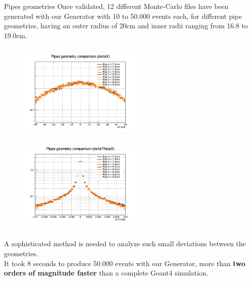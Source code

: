 \documentclass[handout,8 pt]{beamer}
\begin{document}
\begin{frame}{Pipes geometries}
\justifying
Once validated, 12 different Monte-Carlo files have been generated with our Generator with 10 to 50.000 events each, for different pipe geometries, having an outer radius of 20cm and inner radii ranging from 16.8 to 19.0cm. \vfill

\begin{figure}[htbp]
\centering
\begin{minipage}[b]{.49\textwidth}
\includegraphics[width=6cm, height=4.8cm]{figs/deltaX.png}
\end{minipage}\hfill
\begin{minipage}[b]{.49\textwidth}
\includegraphics[width=6cm, height=4.8cm]{figs/deltaThetaX.png}
\end{minipage}\hfill
\label{fig:gemComp}
\end{figure} \vfill

A sophisticated method is needed to analyze such small deviations between the geometries. \\ \vspace{5pt}
It took 8 seconds to produce 50.000 events with our Generator, more than \textbf{two orders of magnitude faster} than a complete Geant4 simulation.  \vfill
\end{frame}
\end{document}
